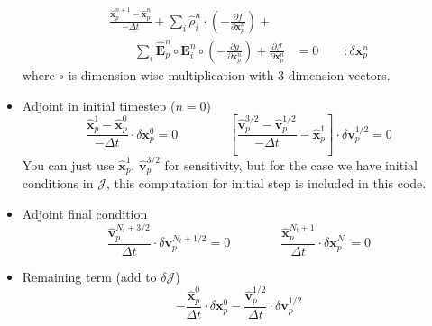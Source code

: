 \documentclass[11pt]{article}
\def\Dpartial#1#2{ \frac{\partial #1}{\partial #2} }
\newcommand{\vp}{\mathbf{v}_p}
\newcommand{\xp}{\mathbf{x}_p}
\newcommand{\Dt}{\Delta t}
\newcommand{\vph}{\hat{\mathbf{v}}_p}
\newcommand{\xph}{\hat{\mathbf{x}}_p}
\newcommand{\Eh}{\hat{\mathbf{E}}}
\newcommand{\rhoh}{\hat{\rho}}
\newcommand{\cJ}{\mathcal{J}}
\begin{document}
\begin{itemize}
\begin{equation*}
\begin{split}
\frac{\xph^{n+1} - \xph^{n}}{-\Dt} + \sum\limits_{i}\rhoh_{i}^{n}\cdot\left( -\Dpartial{f}{\xp^{n}} \right) + &\\
\qquad\sum\limits_{i} \Eh_{p}^{n}\circ\mathbf{E}_{i}^{n}\circ\left( -\Dpartial{g}{\xp^{n}} \right) + \Dpartial{\cJ}{\xp^{n}} &= 0\qquad:\delta \xp^{n}
\end{split}
\end{equation*}
where $\circ$ is dimension-wise multiplication with 3-dimension vectors.
\item Adjoint in initial timestep ($n=0$)
\begin{equation}
\frac{\xph^1-\xph^0}{-\Dt}\cdot\delta \xp^0 = 0\qquad\qquad \left[ \frac{\vph^{3/2} - \vph^{1/2}}{-\Dt} - \xph^1 \right]\cdot\delta \vp^{1/2}=0
\end{equation}
You can just use $\xph^1$, $\vph^{3/2}$ for sensitivity,
but for the case we have initial conditions in $\cJ$, this computation for initial step is included in this code.
\item Adjoint final condition
\begin{equation}
\frac{\vph^{N_t+3/2}}{\Dt}\cdot\delta \vp^{N_t+1/2} = 0\qquad\qquad\frac{\xph^{N_t+1}}{\Dt}\cdot\delta \xp^{N_t} = 0
\end{equation}
\item Remaining term (add to $\delta \cJ$)
\begin{equation}
-\frac{\xph^0}{\Dt}\cdot\delta \xp^0 - \frac{\vph^{1/2}}{\Dt}\cdot\delta \vp^{1/2}
\end{equation}
\end{itemize}
\end{document}

